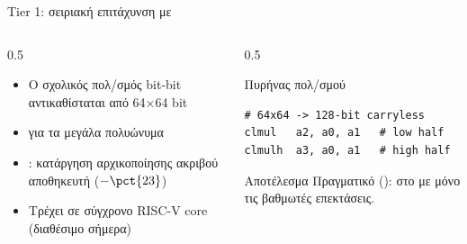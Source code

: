 \begin{frame}[fragile]{Tier 1: σειριακή επιτάχυνση με \Zbc}
  \begin{columns}[T,onlytextwidth]
    \begin{column}{0.5\textwidth}
      \begin{itemize}
        \item Ο σχολικός πολ/σμός bit-bit αντικαθίσταται από \HL{\clmul} 64×64 bit
        \item {} για τα μεγάλα πολυώνυμα~\cite{Karatsuba1962}
        \item {}: κατάργηση αρχικοποίησης ακριβού αποθηκευτή ($-\pct{23}$)
        \item Τρέχει σε  σύγχρονο RISC-V core (διαθέσιμο σήμερα)
      \end{itemize}
    \end{column}
    \begin{column}{0.5\textwidth}
      \begin{exampleblock}{Πυρήνας  πολ/σμού}
\begin{lstlisting}
# 64x64 -> 128-bit carryless
clmul   a2, a0, a1   # low half
clmulh  a3, a0, a1   # high half
\end{lstlisting}
      \end{exampleblock}
      \begin{block}{Αποτέλεσμα}
        Πραγματικό  ():  στο  με μόνο τις βαθμωτές επεκτάσεις.
      \end{block}
    \end{column}
  \end{columns}
\end{frame}
